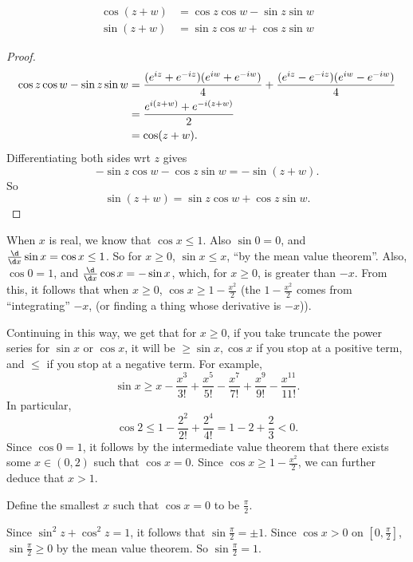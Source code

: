 \documentclass[a4paper]{article}
\begin{document}
\begin{prop}
  \begin{align*}
    \cos(z + w) &= \cos z\cos w - \sin z\sin w\\
    \sin(z + w) &= \sin z \cos w + \cos z \sin w
  \end{align*}
\end{prop}

\begin{proof}
  \begin{align*}
    \cos z\cos w - \sin z \sin w &= \frac{(e^{iz} + e^{-iz})(e^{iw} + e^{-iw})}{4} + \frac{(e^{iz} - e^{-iz})(e^{iw} - e^{-iw})}{4}\\
    &= \frac{e^{i(z + w)} + e^{-i(z + w)}}{2}\\
    &= \cos (z + w). \qedhere
  \end{align*}
  Differentiating both sides wrt $z$ gives
  \[
    -\sin z \cos w - \cos z \sin w = -\sin (z + w).
  \]
  So
  \[
    \sin(z + w) = \sin z\cos w + \cos z \sin w.
  \]
\end{proof}
When $x$ is real, we know that $\cos x \leq 1$. Also $\sin 0 = 0$, and $\frac{\d }{\d x}\sin x = \cos x \leq 1$. So for $x \geq 0$, $\sin x \leq x$, ``by the mean value theorem''. Also, $\cos 0 = 1$, and $\frac{\d}{\d x}\cos x = -\sin x$, which, for $x \geq 0$, is greater than $-x$. From this, it follows that when $x \geq 0$, $\cos x \geq 1 - \frac{x^2}{2}$ (the $1 - \frac{x^2}{2}$ comes from ``integrating'' $-x$, (or finding a thing whose derivative is $-x$)).

Continuing in this way, we get that for $x \geq 0$, if you take truncate the power series for $\sin x$ or $\cos x$, it will be $\geq \sin x, \cos x$ if you stop at a positive term, and $\leq$ if you stop at a negative term. For example,
\[
  \sin x \geq x - \frac{x^3}{3!} + \frac{x^5}{5!} - \frac{x^7}{7!} + \frac{x^9}{9!} - \frac{x^{11}}{11!}.
\]
In particular,
\[
  \cos 2 \leq 1 - \frac{2^2}{2!} + \frac{2^4}{4!} = 1 - 2 + \frac{2}{3} < 0.
\]
Since $\cos 0 = 1$, it follows by the intermediate value theorem that there exists some $x\in (0, 2)$ such that $\cos x = 0$. Since $\cos x \geq 1 - \frac{x^2}{2}$, we can further deduce that $x > 1$.

\begin{defi}[Pi]
  Define the smallest $x$ such that $\cos x = 0$ to be $\frac{\pi}{2}$.
\end{defi}

Since $\sin^2 z + \cos ^2 z = 1$, it follows that $\sin \frac{\pi}{2} = \pm 1$. Since $\cos x > 0$ on $[0, \frac{\pi}{2}]$, $\sin \frac{\pi}{2} \geq 0$ by the mean value theorem. So $\sin \frac{\pi}{2} = 1$.
\end{document}
